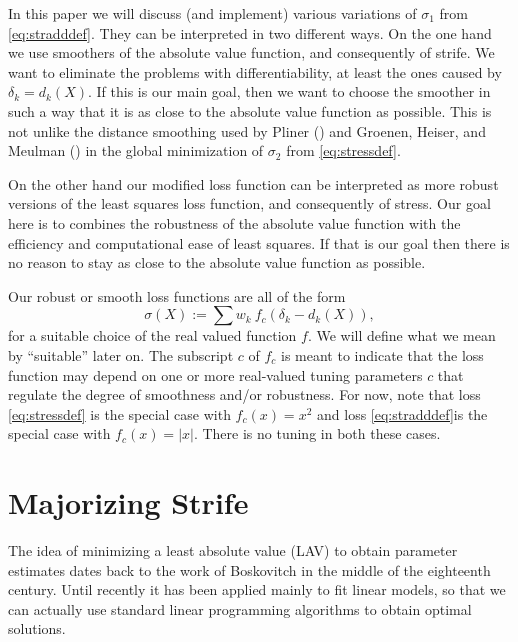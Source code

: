 \documentclass[
  12pt,
  letterpaper,
  DIV=11,
  numbers=noendperiod]{scrartcl}
\newcommand{\sectionbreak}{\pagebreak}
\theoremstyle{plain}
\theoremstyle{plain}
\theoremstyle{plain}
\theoremstyle{definition}
\theoremstyle{remark}
\begin{document}
In this paper we will discuss (and implement) various variations of
\(\sigma_1\) from \eqref{eq:stradddef}. They can be interpreted in two
different ways. On the one hand we use smoothers of the absolute value
function, and consequently of strife. We want to eliminate the problems
with differentiability, at least the ones caused by \(\delta_k=d_k(X)\).
If this is our main goal, then we want to choose the smoother in such a
way that it is as close to the absolute value function as possible. This
is not unlike the distance smoothing used by Pliner
() and Groenen, Heiser, and Meulman
() in the global
minimization of \(\sigma_2\) from \eqref{eq:stressdef}.

On the other hand our modified loss function can be interpreted as more
robust versions of the least squares loss function, and consequently of
stress. Our goal here is to combines the robustness of the absolute
value function with the efficiency and computational ease of least
squares. If that is our goal then there is no reason to stay as close to
the absolute value function as possible.

Our robust or smooth loss functions are all of the form \begin{equation}
\sigma(X):=\sum w_k\ f_c(\delta_k-d_k(X))\label{eq:strifedef},
\end{equation} for a suitable choice of the real valued function \(f\).
We will define what we mean by ``suitable'' later on. The subscript
\(c\) of \(f_c\) is meant to indicate that the loss function may depend
on one or more real-valued tuning parameters \(c\) that regulate the
degree of smoothness and/or robustness. For now, note that loss
\eqref{eq:stressdef} is the special case with \(f_c(x)=x^2\) and loss
\eqref{eq:stradddef}is the special case with \(f_c(x)=|x|\). There is no
tuning in both these cases.

\sectionbreak

\section{Majorizing Strife}\label{sec-majorization}

The idea of minimizing a least absolute value (LAV) to obtain parameter
estimates dates back to the work of Boskovitch in the middle of the
eighteenth century. Until recently it has been applied mainly to fit
linear models, so that we can actually use standard linear programming
algorithms to obtain optimal solutions.
\end{document}
